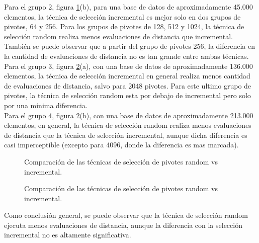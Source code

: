 Para el grupo 2, figura \ref{fig:ETS-1}(b), para una base de datos de aproximadamente 45.000 elementos, la t\'ecnica de selecci\'on incremental es mejor solo en dos grupos de pivotes, 64 y 256. Para los grupos de pivotes de 128, 512 y 1024, la t\'ecnica de selecci\'on random realiza menos evaluaciones de distancia que incremental. Tambi\'en se puede observar que a partir del grupo de pivotes 256, la diferencia en la cantidad de evaluaciones de distancia no es tan grande entre ambas t\'ecnicas.\\

Para el grupo 3, figura \ref{fig:ETS-2}(a), con una base de datos de aproximadamente 136.000 elementos, la t\'ecnica de selecci\'on incremental en general realiza menos cantidad de evaluaciones de distancia, salvo para 2048 pivotes. Para este ultimo grupo de pivotes, la t\'ecnica de selecci\'on random esta por debajo de incremental pero solo por una m\'inima diferencia.\\

Para el grupo 4, figura \ref{fig:ETS-2}(b), con una base de datos de aproximadamente 213.000 elementos, en general, la t\'ecnica de selecci\'on random realiza menos  evaluaciones de distancia que la t\'ecnica de selecci\'on incremental, aunque dicha diferencia es casi imperceptible (excepto para 4096, donde la diferencia es mas marcada).\\


\begin{figure}[tb]
\centering
{}
\caption{\small Comparaci\'on de las t\'ecnicas de selecci\'on de pivotes random vs incremental.}
\label{fig:ETS-1}
\end{figure}
\begin{figure}[tb]
\centering
{}
\caption{\small Comparaci\'on de las t\'ecnicas de selecci\'on de pivotes random vs incremental.}
\label{fig:ETS-2}

\end{figure}

Como conclusi\'on general, se puede observar que la t\'ecnica de selecci\'on random ejecuta menos evaluaciones de distancia, aunque la diferencia con la selecci\'on incremental no es altamente significativa.\\


